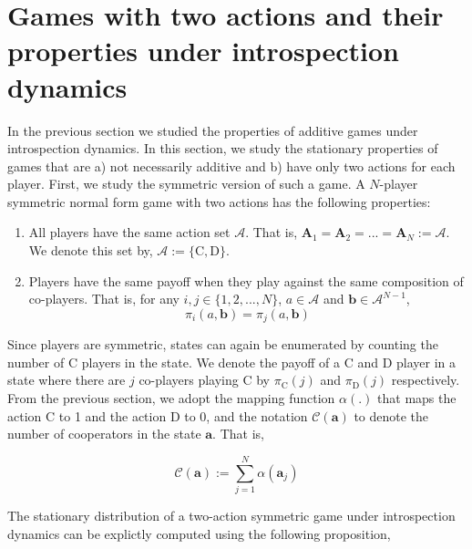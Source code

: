 \documentclass[11pt]{article}
\theoremstyle{plainCl1}
\theoremstyle{plainCl2}
\newcommand{\A}{\mathbf{A}}
\newcommand{\abf}{\mathbf{a}}
\newcommand{\bbf}{\mathbf{b}}
\newcommand{\C}{\mathrm{C}}
\newcommand{\D}{\mathrm{D}}
\begin{document}
\section*{Games with two actions and their properties under introspection dynamics}

In the previous section we studied the properties of additive games under introspection dynamics. In this section, we study the stationary properties of games that are a) not necessarily additive and b) have only two actions for each player. First, we study the symmetric version of such a game. A $N$-player symmetric normal form game with two actions has the following properties:

\begin{enumerate}
\item  All players have the same action set $\mathcal{A}$. That is, $\A_1 = \A_2 = ... = \A_N := \mathcal{A}$. We denote this set by, $\mathcal{A} := \{\C,\D\}$.
\item Players have the same payoff when they play against the same composition of co-players. That is, for any $i,j \in \{1,2,...,N\}$, $a \in \mathcal{A}$ and $\bbf \in \mathcal{A}^{N-1}$,
\begin{equation}
\pi_i(a,\bbf) = \pi_j(a,\bbf)
\end{equation} 
\end{enumerate}

\noindent Since players are symmetric, states can again be enumerated by counting the number of $\C$ players in the state. We denote the payoff of a $\C$ and $\D$ player in a state where there are $j$ co-players playing $\C$ by $\pi_\C(j)$ and $\pi_\D(j)$ respectively. From the previous section, we adopt the mapping function $\alpha(.)$ that maps the action $\C$ to 1 and the action $\D$ to 0, and the notation $\mathcal{C}(\abf)$ to denote the number of cooperators in the state $\abf$. That is,

\begin{equation}
\mathcal{C}(\abf) := \sum_{j=1}^N \alpha(\abf_j)
\end{equation}

\noindent 
The stationary distribution of a two-action symmetric game under introspection dynamics can be explictly computed using the following proposition, 
\end{document}
